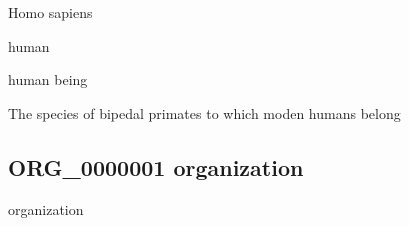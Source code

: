 \documentclass[letterpaper,10pt,english]{sphinxmanual}
\begin{document}
\begin{sphinxShadowBox}

\sphinxAtStartPar
Homo sapiens
\end{sphinxShadowBox}

\begin{sphinxShadowBox}

\sphinxAtStartPar
human

\sphinxAtStartPar
human being
\end{sphinxShadowBox}

\begin{sphinxShadowBox}

\sphinxAtStartPar
{\hyperref[\detokenize{doc-BFO_0000040::doc}]{}}
\end{sphinxShadowBox}

\begin{sphinxShadowBox}

\sphinxAtStartPar
The species of bipedal primates to which moden humans belong
\end{sphinxShadowBox}

\begin{sphinxShadowBox}

\sphinxAtStartPar
{}
\end{sphinxShadowBox}
\begin{quote}

\ignorespaces \end{quote}


\subsection{ORG\_0000001 \sphinxhyphen{} organization}
\label{\detokenize{doc-ORG_0000001:org-0000001-organization}}\label{\detokenize{doc-ORG_0000001:index-0}}\label{\detokenize{doc-ORG_0000001::doc}}
\begin{sphinxShadowBox}

\sphinxAtStartPar
organization
\end{sphinxShadowBox}
\end{document}
